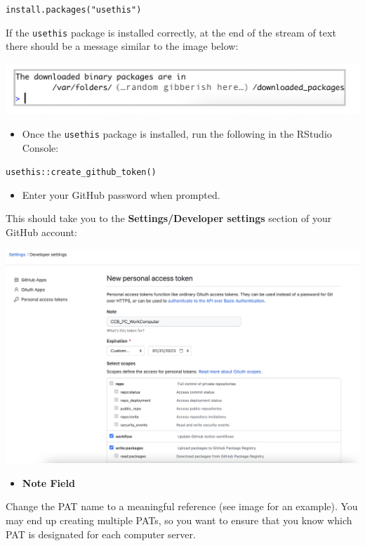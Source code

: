 \documentclass[
]{book}
\providecommand{\tightlist}{%
  \setlength{\itemsep}{0pt}\setlength{\parskip}{0pt}}
\begin{document}
\texttt{install.packages("usethis")}

If the \texttt{usethis} package is installed correctly, at the end of the stream of text there should be a message similar to the image below:

\begin{flushleft}\includegraphics[width=0.8\linewidth]{images/usethis} \end{flushleft}

\begin{itemize}
\tightlist
\item
  Once the \texttt{usethis} package is installed, run the following in the RStudio Console:
\end{itemize}

\texttt{usethis::create\_github\_token()}

\begin{itemize}
\tightlist
\item
  Enter your GitHub password when prompted.
\end{itemize}

This should take you to the \textbf{Settings/Developer settings} section of your GitHub account:

\begin{flushleft}\includegraphics[width=0.8\linewidth]{images/pat} \end{flushleft}

\begin{itemize}
\tightlist
\item
  \textbf{Note Field}
\end{itemize}

Change the PAT name to a meaningful reference (see image for an example). You may end up creating multiple PATs, so you want to ensure that you know which PAT is designated for each computer \textbar{} server.
\end{document}
